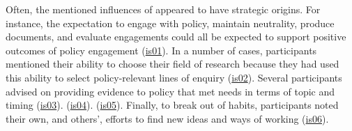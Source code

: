 Often, the mentioned influences of \skiinst{} appeared to have strategic origins. For instance, the expectation to engage with policy, maintain neutrality, produce documents, and evaluate engagements could all be expected to support positive outcomes of policy engagement (\hyperref[tab:resskiinststrat]{is01}). In a number of cases, participants mentioned their ability to choose their field of research because they had used this ability to select policy-relevant lines of enquiry (\hyperref[tab:resskiinststrat]{is02}). Several participants advised on providing evidence to policy that met needs in terms of topic and timing (\hyperref[tab:resskiinststrat]{is03}).  (\hyperref[tab:resskiinststrat]{is04}).  (\hyperref[tab:resskiinststrat]{is05}). Finally, to break out of habits, participants noted their own, and others', efforts to find new ideas and ways of working (\hyperref[tab:resskiinststrat]{is06}).

\subsection{\titinfr}\label{sec:resskiinfr}

